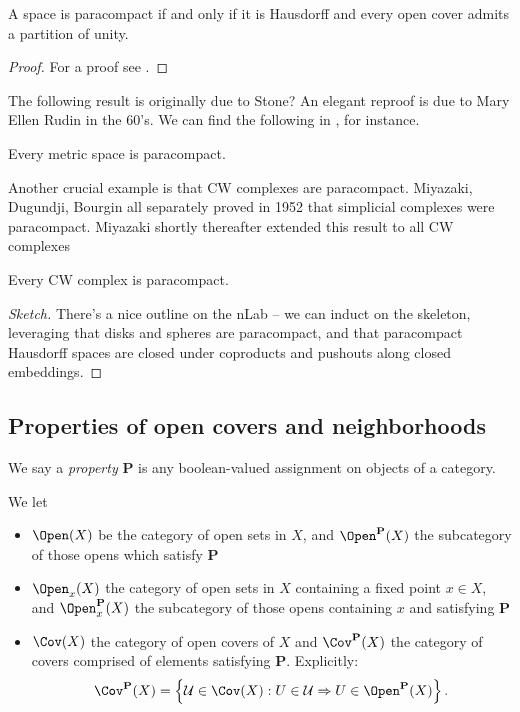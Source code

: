 \documentclass[11pt]{amsart}
\begin{document}
\begin{theorem}\label{thm:paracompact-partition-unity} 
A space is paracompact if and only if it is Hausdorff and every open cover admits a partition of unity.
\end{theorem}
\begin{proof} For a proof see \cite[pp.~30--31]{Hirzebruch}.
\end{proof}

The following result is originally due to Stone? An elegant reproof is due to Mary Ellen Rudin in the 60's. We can find the following in \cite[41.4]{Munkres}, for instance.

\begin{theorem}\label{thm:metric-space-paracompact} Every metric space is paracompact.
\end{theorem}

Another crucial example is that CW complexes are paracompact. Miyazaki, Dugundji, Bourgin all separately proved in 1952 that simplicial complexes were paracompact. Miyazaki shortly thereafter extended this result to all CW complexes

\begin{theorem}
\label{thm:miyazaki}
Every CW complex is paracompact.
\end{theorem}
\begin{proof}[Sketch] There's a nice outline on the nLab -- we can induct on the skeleton, leveraging that disks and spheres are paracompact, and that paracompact Hausdorff spaces are closed under coproducts and pushouts along closed embeddings.
\end{proof}


\newpage
\subsection{Properties of open covers and neighborhoods}

We say a \emph{property} $\mathbf{P}$ is any boolean-valued assignment on objects of a category.

\begin{notation} We let
\begin{itemize}
    \item $\Open(X)$ be the category of open sets in $X$, and $\Open^{\mathbf{P}}(X)$ the subcategory of those opens which satisfy $\mathbf{P}$
    \item $\Open_x(X)$ the category of open sets in $X$ containing a fixed point $x\in X$, and $\Open_x^{\mathbf{P}}(X)$ the subcategory of those opens containing $x$ and satisfying $\mathbf{P}$
    \item $\Cov(X)$ the category of open covers of $X$ and $\Cov^{\mathbf{P}}(X)$ the category of covers comprised of elements satisfying \textbf{P}. Explicitly:
    \begin{align*}
        \Cov^{\mathbf{P}}(X) = \left\{ \mathcal{U}\in \Cov(X) : U\in \mathcal{U} \Rightarrow U\in \Open^{\mathbf{P}}(X) \right\}.
    \end{align*}
\end{itemize}
\end{notation}
\end{document}
